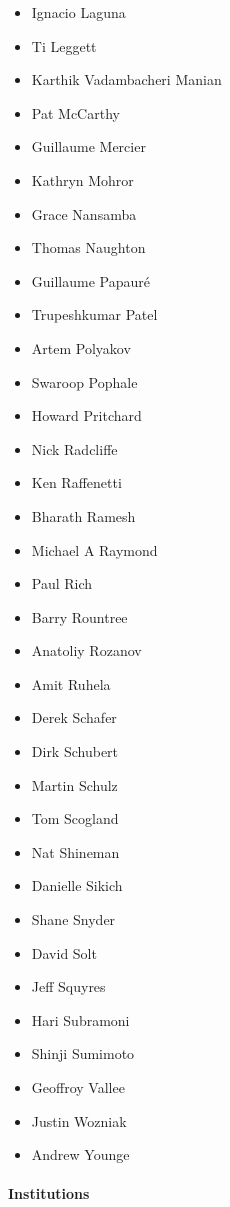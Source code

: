 \begin{itemize}
    \item Ignacio Laguna
    \item Ti Leggett
    \item Karthik Vadambacheri Manian
    \item Pat McCarthy
    \item Guillaume Mercier
    \item Kathryn Mohror
    \item Grace Nansamba
    \item Thomas Naughton
    \item Guillaume Papauré
    \item Trupeshkumar Patel
    \item Artem Polyakov
    \item Swaroop Pophale
    \item Howard Pritchard
    \item Nick Radcliffe
    \item Ken Raffenetti
    \item Bharath Ramesh
    \item Michael A Raymond
    \item Paul Rich
    \item Barry Rountree
    \item Anatoliy Rozanov
    \item Amit Ruhela
    \item Derek Schafer
    \item Dirk Schubert
    \item Martin Schulz
    \item Tom Scogland
    \item Nat Shineman
    \item Danielle Sikich
    \item Shane Snyder
    \item David Solt
    \item Jeff Squyres
    \item Hari Subramoni
    \item Shinji Sumimoto
    \item Geoffroy Vallee
    \item Justin Wozniak
    \item Andrew Younge
\end{itemize}

\paragraph*{Institutions}


